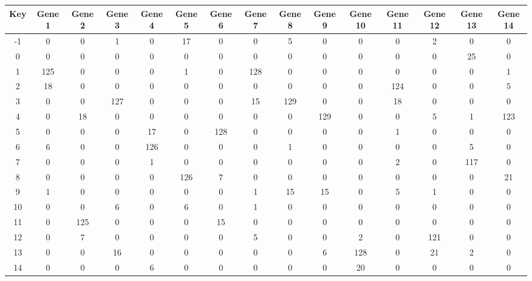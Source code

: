 \begin{tabular}{|c|c|c|c|c|c|c|c|c|c|c|c|c|c|c|}
\hline
Key & Gene 1 & Gene 2 & Gene 3 & Gene 4 & Gene 5 & Gene 6 & Gene 7 & Gene 8 & Gene 9 & Gene 10 & Gene 11 & Gene 12 & Gene 13 & Gene 14 \\
\hline
-1 & 0 & 0 & 1 & 0 & 17 & 0 & 0 & 5 & 0 & 0 & 0 & 2 & 0 & 0 \\
0 & 0 & 0 & 0 & 0 & 0 & 0 & 0 & 0 & 0 & 0 & 0 & 0 & 25 & 0 \\
1 & 125 & 0 & 0 & 0 & 1 & 0 & 128 & 0 & 0 & 0 & 0 & 0 & 0 & 1 \\
2 & 18 & 0 & 0 & 0 & 0 & 0 & 0 & 0 & 0 & 0 & 124 & 0 & 0 & 5 \\
3 & 0 & 0 & 127 & 0 & 0 & 0 & 15 & 129 & 0 & 0 & 18 & 0 & 0 & 0 \\
4 & 0 & 18 & 0 & 0 & 0 & 0 & 0 & 0 & 129 & 0 & 0 & 5 & 1 & 123 \\
5 & 0 & 0 & 0 & 17 & 0 & 128 & 0 & 0 & 0 & 0 & 1 & 0 & 0 & 0 \\
6 & 6 & 0 & 0 & 126 & 0 & 0 & 0 & 1 & 0 & 0 & 0 & 0 & 5 & 0 \\
7 & 0 & 0 & 0 & 1 & 0 & 0 & 0 & 0 & 0 & 0 & 2 & 0 & 117 & 0 \\
8 & 0 & 0 & 0 & 0 & 126 & 7 & 0 & 0 & 0 & 0 & 0 & 0 & 0 & 21 \\
9 & 1 & 0 & 0 & 0 & 0 & 0 & 1 & 15 & 15 & 0 & 5 & 1 & 0 & 0 \\
10 & 0 & 0 & 6 & 0 & 6 & 0 & 1 & 0 & 0 & 0 & 0 & 0 & 0 & 0 \\
11 & 0 & 125 & 0 & 0 & 0 & 15 & 0 & 0 & 0 & 0 & 0 & 0 & 0 & 0 \\
12 & 0 & 7 & 0 & 0 & 0 & 0 & 5 & 0 & 0 & 2 & 0 & 121 & 0 & 0 \\
13 & 0 & 0 & 16 & 0 & 0 & 0 & 0 & 0 & 6 & 128 & 0 & 21 & 2 & 0 \\
14 & 0 & 0 & 0 & 6 & 0 & 0 & 0 & 0 & 0 & 20 & 0 & 0 & 0 & 0 \\
\hline
\end{tabular}